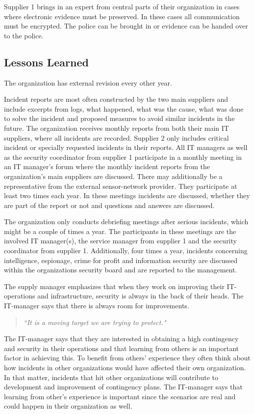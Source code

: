 Supplier 1 brings in an expert from central parts of their organization in cases where electronic evidence must be preserved. In these cases all communication must be encrypted. The police can be brought in or evidence can be handed over to the police.

\subsection{Lessons Learned}
The organization has external revision every other year.

Incident reports are most often constructed by the two main suppliers and include excerpts from logs, what happened, what was the cause, what was done to solve the incident and proposed measures to avoid similar incidents in the future. The organization receives monthly reports from both their main IT suppliers, where all incidents are recorded. Supplier 2 only includes critical incident or specially requested incidents in their reports. All IT managers as well as the security coordinator from supplier 1 participate in a monthly meeting in an IT manager's forum where the monthly incident reports from the organization's main suppliers are discussed. There may additionally be a representative from the external sensor-network provider. They participate at least two times each year. In these meetings incidents are discussed, whether they are part of the report or not and questions and answers are discussed.

The organization only conducts debriefing meetings after serious incidents, which might be a couple of times a year. The participants in these meetings are the involved IT manager(s), the service manager from supplier 1 and the security coordinator from supplier 1. Additionally, four times a year, incidents concerning intelligence, espionage, crime for profit and information security are discussed within the organizations security board and are reported to the management. 

The supply manager emphasizes that when they work on improving their IT-operations and infrastructure, security is always in the back of their heads. The IT-manager says that there is always room for improvements. 
\begin{quote}
\textit{``It is a moving target we are trying to protect."}
\end{quote}

The IT-manager says that they are interested in obtaining a high contingency %
and security in their operations and that learning from others is an important factor in achieving this. To benefit from others' experience they often think about how incidents in other organizations would have affected their own organization. In that matter, incidents that hit other organizations will contribute to development and improvement of contingency plans. The IT-manager says that learning from other's experience is important since the scenarios are real and could happen in their organization as well.

